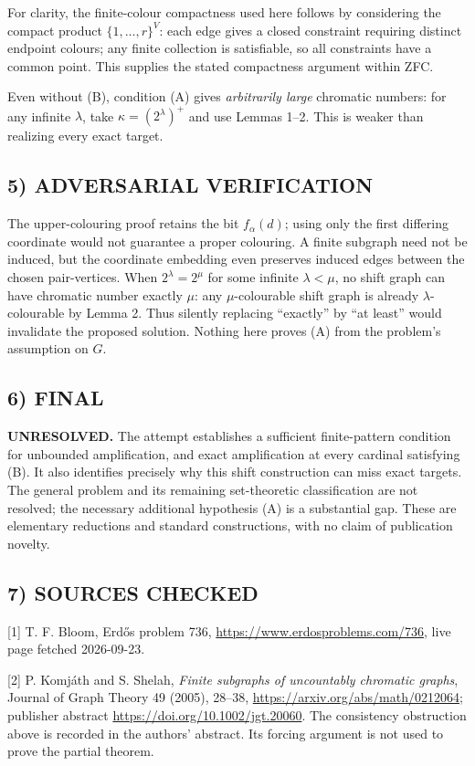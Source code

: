For clarity, the finite-colour compactness used here follows by considering the compact product $\{1,\ldots,r\}^{V}$: each edge gives a closed constraint requiring distinct endpoint colours; any finite collection is satisfiable, so all constraints have a common point. This supplies the stated compactness argument within ZFC.

Even without (B), condition (A) gives \emph{arbitrarily large} chromatic numbers: for any infinite $\lambda$, take $\kappa=(2^\lambda)^+$ and use Lemmas 1--2. This is weaker than realizing every exact target.

\subsection*{5) ADVERSARIAL VERIFICATION}
The upper-colouring proof retains the bit $f_\alpha(d)$; using only the first differing coordinate would not guarantee a proper colouring. A finite subgraph need not be induced, but the coordinate embedding even preserves induced edges between the chosen pair-vertices. When $2^\lambda=2^\mu$ for some infinite $\lambda<\mu$, no shift graph can have chromatic number exactly $\mu$: any $\mu$-colourable shift graph is already $\lambda$-colourable by Lemma 2. Thus silently replacing ``exactly'' by ``at least'' would invalidate the proposed solution. Nothing here proves (A) from the problem's assumption on $G$.

\subsection*{6) FINAL}
\textbf{UNRESOLVED.} The attempt establishes a sufficient finite-pattern condition for unbounded amplification, and exact amplification at every cardinal satisfying (B). It also identifies precisely why this shift construction can miss exact targets. The general problem and its remaining set-theoretic classification are not resolved; the necessary additional hypothesis (A) is a substantial gap. These are elementary reductions and standard constructions, with no claim of publication novelty.

\subsection*{7) SOURCES CHECKED}
[1] T. F. Bloom, Erd\H{o}s problem 736, \url{https://www.erdosproblems.com/736}, live page fetched 2026-09-23.

[2] P. Komj\'ath and S. Shelah, \emph{Finite subgraphs of uncountably chromatic graphs}, Journal of Graph Theory 49 (2005), 28--38, \url{https://arxiv.org/abs/math/0212064}; publisher abstract \url{https://doi.org/10.1002/jgt.20060}. The consistency obstruction above is recorded in the authors' abstract. Its forcing argument is not used to prove the partial theorem.


